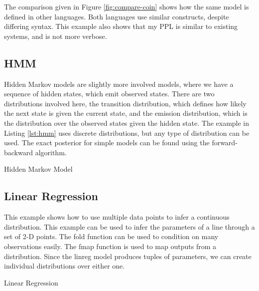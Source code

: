 The comparison given in Figure \ref{fig:compare-coin} shows how the same model is defined in other languages. Both languages use similar constructs, despite differing syntax. This example also shows that my PPL is similar to existing systems, and is not more verbose.

\subsection{HMM}
Hidden Markov models are slightly more involved models, where we have a sequence of hidden states, which emit observed states. There are two distributions involved here, the transition distribution, which defines how likely the next state is given the current state, and the emission distribution, which is the distribution over the observed states given the hidden state. The example in Listing \ref{lst:hmm} uses discrete distributions, but any type of distribution can be used. The exact posterior for simple models can be found using the forward-backward algorithm.
\begin{listing}[!ht]
	\caption{Hidden Markov Model}
	\label{lst:hmm}
\end{listing}

\subsection{Linear Regression}
This example shows how to use multiple data points to infer a continuous distribution. This example can be used to infer the parameters of a line through a set of 2-D points. The fold function can be used to condition on many observations easily. The fmap function is used to map outputs from a distribution. Since the linreg model produces tuples of parameters, we can create individual distributions over either one.

\begin{listing}[!ht]
	\caption{Linear Regression}
	\label{lst:coin}
\end{listing}


